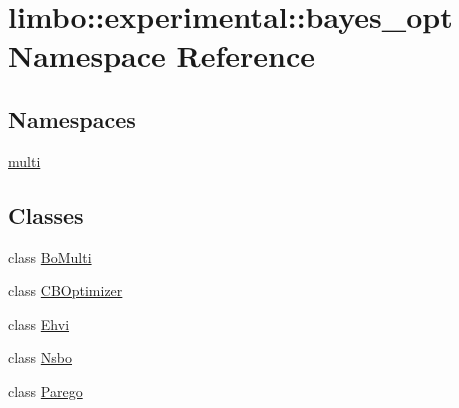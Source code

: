 \hypertarget{namespacelimbo_1_1experimental_1_1bayes__opt}{}\section{limbo\+:\+:experimental\+:\+:bayes\+\_\+opt Namespace Reference}
\label{namespacelimbo_1_1experimental_1_1bayes__opt}
\subsection*{Namespaces}
\begin{DoxyCompactItemize}
\item 
 \hyperlink{namespacelimbo_1_1experimental_1_1bayes__opt_1_1multi}{multi}
\end{DoxyCompactItemize}
\subsection*{Classes}
\begin{DoxyCompactItemize}
\item 
class \hyperlink{classlimbo_1_1experimental_1_1bayes__opt_1_1_bo_multi}{Bo\+Multi}
\item 
class \hyperlink{classlimbo_1_1experimental_1_1bayes__opt_1_1_c_b_optimizer}{C\+B\+Optimizer}
\item 
class \hyperlink{classlimbo_1_1experimental_1_1bayes__opt_1_1_ehvi}{Ehvi}
\item 
class \hyperlink{classlimbo_1_1experimental_1_1bayes__opt_1_1_nsbo}{Nsbo}
\item 
class \hyperlink{classlimbo_1_1experimental_1_1bayes__opt_1_1_parego}{Parego}
\end{DoxyCompactItemize}
